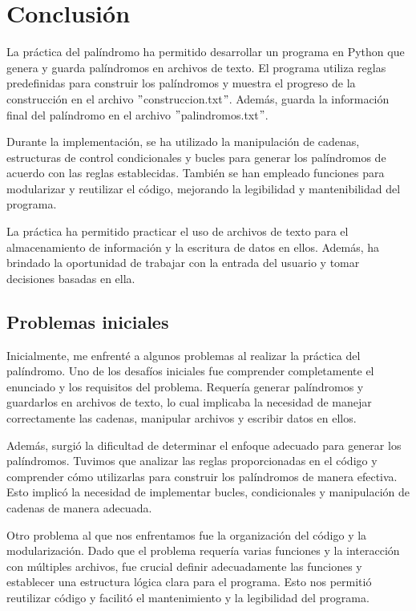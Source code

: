 \chapter{Conclusión}

La práctica del palíndromo ha permitido desarrollar un programa en Python que genera y guarda palíndromos en archivos de texto. El programa utiliza reglas predefinidas para construir los palíndromos y muestra el progreso de la construcción en el archivo $"$construccion.txt$"$. Además, guarda la información final del palíndromo en el archivo $"$palindromos.txt$"$.\newline

Durante la implementación, se ha utilizado la manipulación de cadenas, estructuras de control condicionales y bucles para generar los palíndromos de acuerdo con las reglas establecidas. También se han empleado funciones para modularizar y reutilizar el código, mejorando la legibilidad y mantenibilidad del programa.\newline

La práctica ha permitido practicar el uso de archivos de texto para el almacenamiento de información y la escritura de datos en ellos. Además, ha brindado la oportunidad de trabajar con la entrada del usuario y tomar decisiones basadas en ella.\newline
\\

\section{Problemas iniciales}
Inicialmente, me enfrenté a algunos problemas al realizar la práctica del palíndromo. Uno de los desafíos iniciales fue comprender completamente el enunciado y los requisitos del problema. Requería generar palíndromos y guardarlos en archivos de texto, lo cual implicaba la necesidad de manejar correctamente las cadenas, manipular archivos y escribir datos en ellos.\newline

Además, surgió la dificultad de determinar el enfoque adecuado para generar los palíndromos. Tuvimos que analizar las reglas proporcionadas en el código y comprender cómo utilizarlas para construir los palíndromos de manera efectiva. Esto implicó la necesidad de implementar bucles, condicionales y manipulación de cadenas de manera adecuada.\newline

Otro problema al que nos enfrentamos fue la organización del código y la modularización. Dado que el problema requería varias funciones y la interacción con múltiples archivos, fue crucial definir adecuadamente las funciones y establecer una estructura lógica clara para el programa. Esto nos permitió reutilizar código y facilitó el mantenimiento y la legibilidad del programa.\newline

